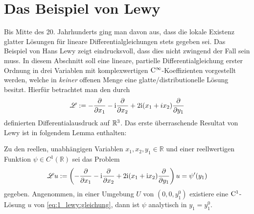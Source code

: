 

\section{Das Beispiel von Lewy}


Bis Mitte des 20. Jahrhunderts ging man davon aus, dass die lokale Existenz glatter Lösungen für lineare Differentialgleichungen stets gegeben sei. Das Beispiel von Hans Lewy zeigt eindrucksvoll, dass dies nicht zwingend der Fall sein muss.  In diesem Abschnitt soll eine lineare, partielle Differentialgleichung erster Ordnung in drei Variablen mit komplexwertigen $\mathrm C^\infty$-Koeffizienten vorgestellt werden, welche in \textit{keiner} offenen Menge eine glatte/distributionelle Lösung besitzt. Hierfür betrachtet man den durch
\begin{equation}\label{lewy:differentialausdruck}
\mathscr L := -\frac{\partial}{\partial x_1} -\mathrm i\frac{\partial}{\partial x_2} +2\mathrm i(x_1+ix_2)\frac{\partial}{\partial y_1}
\end{equation}
definierten Differentialausdruck auf $\mathbb R^3$.%
Das erste überraschende Resultat von Lewy ist in folgendem Lemma enthalten:
\begin{lem}\label{thm:1_lewy}
Zu den reellen, unabhängigen Variablen $x_1,x_2,y_1\in\mathbb{R}$ und einer reellwertigen Funktion $\psi\in C^1(\mathbb{R})$ sei das Problem
\begin{equation}\label{eq:1_lewy:gleichung}
\mathscr Lu:= \left(-\frac{\partial}{\partial x_1} -\mathrm i\frac{\partial}{\partial x_2} +2\mathrm i(x_1+\mathrm i x_2)\frac{\partial}{\partial y_1}\right)u=\psi'(y_1)
\end{equation}
gegeben. Angenommen, in einer Umgebung $U$ von $(0,0,y_1^0)$ existiere eine $\mathrm C^1$-Lösung $u$ von \eqref{eq:1_lewy:gleichung}, dann ist $\psi$ analytisch in $y_1=y_1^0$.
\end{lem}

